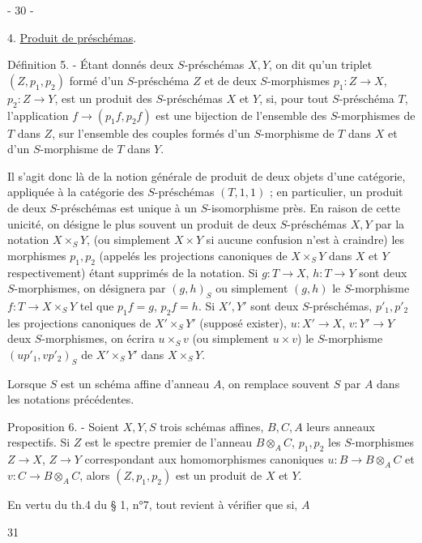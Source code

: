 
- 30 -

4. \underline{Produit de préschémas}.

Définition 5. - Étant donnés deux $S$-préschémas $X, Y$, on dit qu'un triplet $(Z, p_1, p_2)$ formé d'un $S$-préschéma $Z$ et de deux $S$-morphismes $p_1: Z \to X$, $p_2: Z \to Y$, est un produit des $S$-préschémas $X$ et $Y$, si, pour tout $S$-préschéma $T$, l'application $f \to (p_1 f, p_2 f)$ est une bijection de l'ensemble des $S$-morphismes de $T$ dans $Z$, sur l'ensemble des couples formés d'un $S$-morphisme de $T$ dans $X$ et d'un $S$-morphisme de $T$ dans $Y$.

Il s'agit donc là de la notion générale de produit de deux objets d'une catégorie, appliquée à la catégorie des $S$-préschémas $(T, 1, 1)$ ; en particulier, un produit de deux $S$-préschémas est unique à un $S$-isomorphisme près. En raison de cette unicité, on désigne le plus souvent un produit de deux $S$-préschémas $X, Y$ par la notation $X \times_S Y$, (ou simplement $X \times Y$ si aucune confusion n'est à craindre) les morphismes $p_1, p_2$ (appelés les projections canoniques de $X \times_S Y$ dans $X$ et $Y$ respectivement) étant supprimés de la notation. Si $g: T \to X$, $h: T \to Y$ sont deux $S$-morphismes, on désignera par $(g, h)_S$ ou simplement $(g, h)$ le $S$-morphisme $f: T \to X \times_S Y$ tel que $p_1 f = g$, $p_2 f = h$. Si $X', Y'$ sont deux $S$-préschémas, $p'_1, p'_2$ les projections canoniques de $X' \times_S Y'$ (supposé exister), $u: X' \to X$, $v: Y' \to Y$ deux $S$-morphismes, on écrira $u \times_S v$ (ou simplement $u \times v$) le $S$-morphisme $(u p'_1, v p'_2)_S$ de $X' \times_S Y'$ dans $X \times_S Y$.

Lorsque $S$ est un schéma affine d'anneau $A$, on remplace souvent $S$ par $A$ dans les notations précédentes.

Proposition 6. - Soient $X, Y, S$ trois schémas affines, $B, C, A$ leurs anneaux respectifs. Si $Z$ est le spectre premier de l'anneau $B \otimes_A C$, $p_1, p_2$ les $S$-morphismes $Z \to X$, $Z \to Y$ correspondant aux homomorphismes canoniques $u: B \to B \otimes_A C$ et $v: C \to B \otimes_A C$, alors $(Z, p_1, p_2)$ est un produit de $X$ et $Y$.

En vertu du th.4 du § 1, n°7, tout revient à vérifier que si, $A$

\newpage


\hfill 31 \hfill

